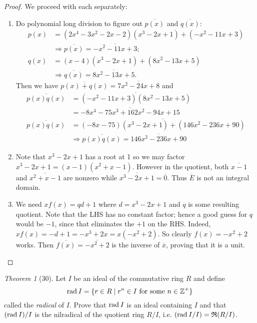 \documentclass[12pt]{article}
\theoremstyle{remark}
\theoremstyle{named}
\newtheorem*{theorem}{Theorem}
\newcommand{\Z}{\mathbb Z}
\newcommand{\rad}{\text{rad}\hspace*{0.7mm}}
\begin{document}
\begin{proof}
    We proceed with each separately:
    \begin{enumerate}
        \item Do polynomial long division to figure out \(\overline{p(x)}\) and \(\overline{q(x)}\):
        \begin{align*}
            p(x) &= (2x^4 - 3x^2 - 2x - 2) (x^3 - 2x + 1) + (-x^2 - 11x + 3) \\
            &\Rightarrow \overline{p(x)} = \overline{-x^2 - 11x + 3}; \\
            q(x) &= (x - 4)(x^3 - 2x + 1) + (8x^2 - 13x + 5) \\
            &\Rightarrow \overline{q(x)} = \overline{8x^2 - 13x + 5}.
        \end{align*}
        Then we have \(\overline{p(x) + q(x)} = \overline{7x^2 - 24x + 8}\) and 
        \begin{align*}
            \overline{p(x)q(x)} &= \overline{(-x^2 - 11x + 3)(8x^2 - 13x + 5)} \\
            &= \overline{-8x^4-75x^3+162x^2-94x+15} \\
            \overline{p(x)q(x)} &= \overline{(-8x - 75)(x^3 - 2x + 1) + (146x^2 - 236x + 90)} \\
            &\Rightarrow   \overline{p(x)q(x)} = \overline{146x^2 - 236x + 90}
        \end{align*}
        \item Note that \(x^3 - 2x + 1\) has a root at 1 so we may factor \(x^3 - 2x + 1 = (x - 1)(x^2 + x - 1)\). However in the quotient, both \(\overline{x - 1}\) and \(\overline{x^2 + x - 1}\) are nonzero while \(\overline{x^3 - 2x + 1} = \overline{0}\). Thus \(\overline{E}\) is not an integral domain.
        \item We need \(xf(x) = qd + 1\) where \(d = x^3 - 2x + 1\) and \(q\) is some resulting quotient. Note that the LHS has no constant factor; hence a good guess for \(q\) would be \(-1\), since that eliminates the \(+1\) on the RHS. Indeed, \(xf(x) = -d + 1 = -x^3 + 2x = x(-x^2 + 2)\). So clearly \(f(x) = -x^2 + 2\) works. Then \(\overline{f(x)} = \overline{-x^2 + 2}\) is the inverse of \(\overline{x}\), proving that it is a unit.
    \end{enumerate}
\end{proof}

\begin{theorem}[30]
    Let \(I\) be an ideal of the commutative ring \(R\) and define 
    \[\rad I = \{r \in R \mid r^n \in I \text{ for some } n \in \Z^+\}\]
    called the \textit{radical} of \(I\). Prove that \(\rad I\) is an ideal containing \(I\) and that \((\rad I)/I\) is the nilradical of the quotient ring \(R / I\), i.e. \((\rad I / I) = \mathfrak{R}(R / I)\).
\end{theorem}
\end{document}
